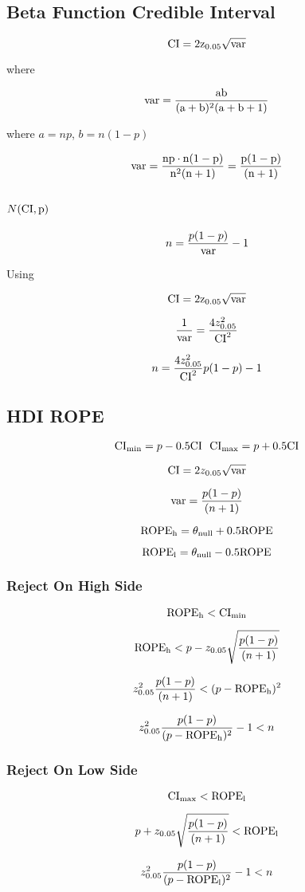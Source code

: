 
\subsection{Beta Function Credible Interval}


$$\rm{CI} = 2 z_{0.05} \sqrt{\rm{var}}$$

where

$$\rm{var}=\frac{ab}{(a + b)^2(a + b +1)}$$

where $a = n p$, $b = n (1-p)$

$$\rm{var} = \frac{np \cdot n(1-p)}{n^2(n +1)} = \frac{p(1-p)}{(n+1)}$$

\subsection{$N(\rm{CI}, p)$}



$$n = \frac{p(1-p)}{\rm{var}} - 1$$

Using 

$$\rm{CI} = 2 z_{0.05} \sqrt{\rm{var}}$$


$$\frac{1}{\rm{var}} = \frac{4 z_{0.05}^2}{\rm{CI}^2}$$


$$n = \frac{4 z_{0.05}^2}{\rm{CI}^2}p(1-p) - 1$$

\subsection{HDI ROPE}


$${\rm CI}_{\rm min} = p - 0.5 {\rm CI} \ \ {\rm CI}_{\rm max} = p + 0.5 {\rm CI}$$

$${\rm CI} = 2 z_{0.05} \sqrt{{\rm var}}$$ 

$${\rm var} = \frac{p(1-p)}{(n+1)}$$

$${\rm ROPE}_{\rm h} = \theta_{\rm null} + 0.5 {\rm ROPE}$$

$${\rm ROPE}_{\rm l} = \theta_{\rm null} - 0.5 {\rm ROPE}$$

\subsubsection{Reject On High Side}

$${\rm ROPE}_{\rm h} < {\rm CI}_{\rm min}$$

$${\rm ROPE}_{\rm h} < p - z_{0.05} \sqrt{\frac{p(1-p)}{(n+1)}}$$


$$ z_{0.05}^2 \frac{p(1-p)}{(n+1)} < (p - {\rm ROPE}_{\rm h})^2 $$

$$z_{0.05}^2 \frac{p(1-p)}{ ( p - {\rm ROPE}_{\rm h})^2}- 1 < n$$

\subsubsection{Reject On Low Side}

$${\rm CI}_{\rm max} < {\rm ROPE}_{\rm l}$$


$$p + z_{0.05} \sqrt{\frac{p(1-p)}{(n+1)}} < {\rm ROPE}_{\rm l}$$

$$z_{0.05}^2 \frac{p(1-p)}{ ( p - {\rm ROPE}_{\rm l})^2}- 1 < n$$